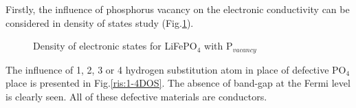 Firstly, the influence of phosphorus vacancy on the electronic conductivity can be considered in density of states study (Fig.\ref{ris:0DOS}).

\begin{figure}[ht]
\caption{Density of electronic states for LiFePO$_4$ with P$_{vacancy}$}
\label{ris:0DOS}
\end{figure}

The influence of 1, 2, 3 or 4 hydrogen substitution atom in place of defective PO$_4$ place is presented in Fig.\ref{ris:1-4DOS}. The absence of band-gap at the Fermi level is clearly seen. All of these defective materials are conductors.

